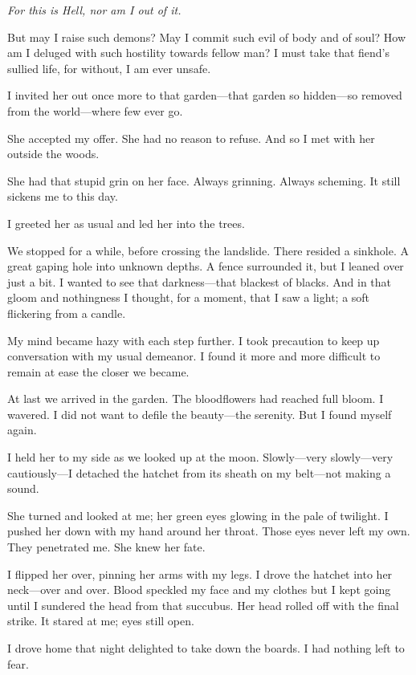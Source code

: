 \documentclass{article}
\begin{document}
\textit{For this is Hell, nor am I out of it.}
\VV


\noindent
But may I raise such demons?
May I commit such evil of body and of soul?
How am I deluged with such hostility towards fellow man?
I must take that fiend's sullied life,
for without, I am ever unsafe.
\VV


\noindent
I invited her out once more to that garden---that
garden so hidden---so removed from the world---where
few ever go. %


She accepted my offer.
She had no reason to refuse.
And so I met with her outside the woods.


She had that stupid grin on her face.
Always grinning. Always scheming.
It still sickens me to this day.


I greeted her as usual and led her into the trees.


We stopped for a while, before crossing the landslide.
There resided a sinkhole.
A great gaping hole into unknown depths.
A fence surrounded it,
but I leaned over just a bit.
I wanted to see that darkness---that
blackest of blacks.
And in that gloom and nothingness I thought, for a moment,
that I saw a light; a soft flickering from a candle.


My mind became hazy with each step further.
I took precaution to keep up conversation with my usual demeanor.
I found it more and more difficult to remain at ease the closer we became.


At last we arrived in the garden.
The bloodflowers had reached full bloom.
I wavered.  I did not want to defile the beauty---the serenity.
But I found myself again.


I held her to my side as we looked up at the moon.
Slowly---very slowly---very cautiously---I
detached the hatchet from its sheath on my belt---not making a sound.


She turned and looked at me;
her green eyes glowing in the pale of twilight.
I pushed her down with my hand around her throat.
Those eyes never left my own. They penetrated me.
She knew her fate.


I flipped her over, pinning her arms with my legs.
I drove the hatchet into her neck---over and over.
Blood speckled my face and my clothes but I kept going
until I sundered the head from that succubus.
Her head rolled off with the final strike.
It stared at me; eyes still open.


I drove home that night delighted to take down the boards.
I had nothing left to fear.
\VV
\end{document}
